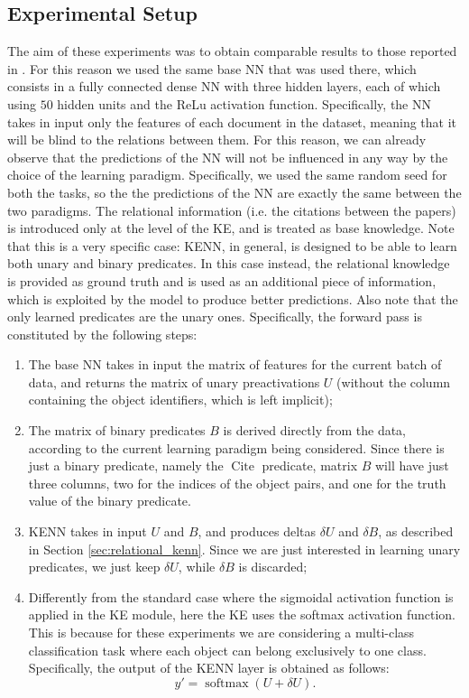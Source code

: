 \subsection{Experimental Setup}
The aim of these experiments was to obtain comparable results to those reported in \cite{marra2020relational}. For this reason we used the same base NN that was used there, which consists in a fully connected dense NN with three hidden layers, each of which using $50$ hidden units and the ReLu activation function. Specifically, the NN takes in input only the features of each document in the dataset, meaning that it will be blind to the relations between them. For this reason, we can already observe that the predictions of the NN will not be influenced in any way by the choice of the learning paradigm. Specifically, we used the same random seed for both the tasks, so the the predictions of the NN are exactly the same between the two paradigms.
The relational information (i.e. the citations between the papers) is introduced only at the level of the KE, and is treated as base knowledge. Note that this is a very specific case: KENN, in general, is designed to be able to learn both unary and binary predicates. In this case instead, the relational knowledge is provided as ground truth and is used as an additional piece of information, which is exploited by the model to produce better predictions. Also note that the only learned predicates are the unary ones. Specifically, the forward pass is constituted by the following steps:
\begin{enumerate}
	\item The base NN takes in input the matrix of features for the current batch of data, and returns the matrix of unary preactivations $U$ (without the column containing the object identifiers, which is left implicit);
	\item The matrix of binary predicates $B$ is derived directly from the data, according to the current learning paradigm being considered. Since there is just a binary predicate, namely the $\operatorname{Cite}$ predicate, matrix $B$ will have just three columns, two for the indices of the object pairs, and one for the truth value of the binary predicate. 
	\item KENN takes in input $U$ and $B$, and produces deltas $\delta U$ and $\delta B$, as described in Section \ref{sec:relational_kenn}. Since we are just interested in learning unary predicates, we just keep $\delta U$, while $\delta B$ is discarded;
	\item Differently from the standard case where the sigmoidal activation function is applied in the KE module, here the KE uses the softmax activation function. This is because for these experiments we are considering a multi-class classification task where each object can belong exclusively to one class. Specifically, the output of the KENN layer is obtained as follows:
	\begin{equation*}
	y'= \operatorname{softmax}(U + \delta U).
	\end{equation*}
	
\end{enumerate}

